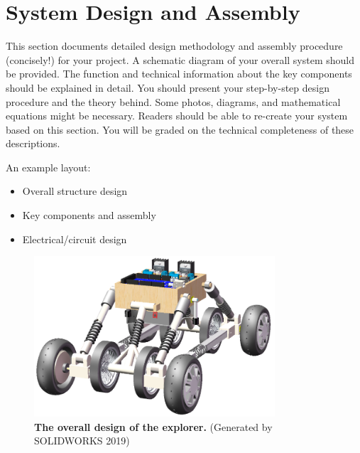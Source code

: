 \documentclass{engr1000j-s2}
\begin{document}
  \section{System Design and Assembly}
  This section documents detailed design methodology and assembly procedure (concisely!)
  for your project. A schematic diagram of your overall system should be provided.
  The function and technical information about the key components should be
  explained in detail. You should present your step-by-step design procedure and
  the theory behind. Some photos, diagrams, and mathematical equations might be
  necessary. Readers should be able to re-create your system based on this section.
  You will be graded on the technical completeness of these descriptions.

  An example layout:

  \begin{itemize}
    \item Overall structure design
      \newline

    \item Key components and assembly
      \newline

    \item Electrical/circuit design
  \end{itemize}

  \begin{figure}[H]
    \centering
    \includegraphics[width=0.8\textwidth]{figures/overall_design.png}
    \caption{\quad \textbf{The overall design of the explorer.} (Generated by
    SOLIDWORKS 2019)}
    \label{fig:overall_design}
  \end{figure}
\end{document}
